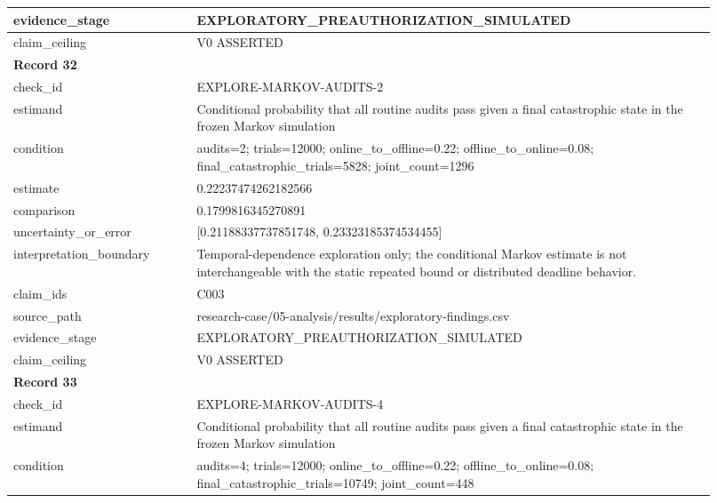 \begin{longtable}{|p{0.24\linewidth}|p{0.68\linewidth}|}
evidence\_\allowbreak{}stage & EXPLORATORY\_\allowbreak{}PREAUTHORIZATION\_\allowbreak{}SIMULATED \\ \hline
claim\_\allowbreak{}ceiling & V0 ASSERTED \\ \hline
\multicolumn{2}{|l|}{\textbf{Record 32}} \\ \hline
check\_\allowbreak{}id & EXPLORE-MARKOV-AUDITS-2 \\ \hline
estimand & Conditional probability that all routine audits pass given a final catastrophic state in the frozen Markov simulation \\ \hline
condition & audits=2;\allowbreak{} trials=12000;\allowbreak{} online\_\allowbreak{}to\_\allowbreak{}offline=0.22;\allowbreak{} offline\_\allowbreak{}to\_\allowbreak{}online=0.08;\allowbreak{} final\_\allowbreak{}catastrophic\_\allowbreak{}trials=5828;\allowbreak{} joint\_\allowbreak{}count=1296 \\ \hline
estimate & 0.22237474262182566 \\ \hline
comparison & 0.1799816345270891 \\ \hline
uncertainty\_\allowbreak{}or\_\allowbreak{}error & [0.21188337737851748, 0.23323185374534455] \\ \hline
interpretation\_\allowbreak{}boundary & Temporal-dependence exploration only;\allowbreak{} the conditional Markov estimate is not interchangeable with the static repeated bound or distributed deadline behavior. \\ \hline
claim\_\allowbreak{}ids & C003 \\ \hline
source\_\allowbreak{}path & research-case/05-analysis/results/exploratory-findings.csv \\ \hline
evidence\_\allowbreak{}stage & EXPLORATORY\_\allowbreak{}PREAUTHORIZATION\_\allowbreak{}SIMULATED \\ \hline
claim\_\allowbreak{}ceiling & V0 ASSERTED \\ \hline
\multicolumn{2}{|l|}{\textbf{Record 33}} \\ \hline
check\_\allowbreak{}id & EXPLORE-MARKOV-AUDITS-4 \\ \hline
estimand & Conditional probability that all routine audits pass given a final catastrophic state in the frozen Markov simulation \\ \hline
condition & audits=4;\allowbreak{} trials=12000;\allowbreak{} online\_\allowbreak{}to\_\allowbreak{}offline=0.22;\allowbreak{} offline\_\allowbreak{}to\_\allowbreak{}online=0.08;\allowbreak{} final\_\allowbreak{}catastrophic\_\allowbreak{}trials=10749;\allowbreak{} joint\_\allowbreak{}count=448 \\ \hline

\end{longtable}
